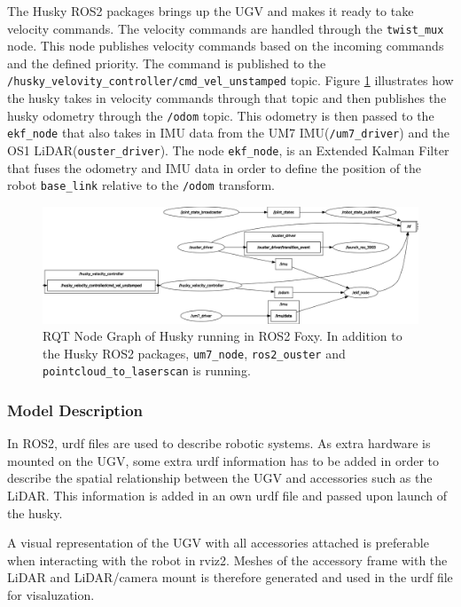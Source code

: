 The Husky ROS2 packages brings up the UGV and makes it ready to take velocity commands. The velocity commands are handled through the \lstinline{twist_mux} node. This node publishes velocity commands based on the incoming commands and the defined priority. The command is published to the \lstinline{/husky_velovity_controller/cmd_vel_unstamped} topic. Figure \ref{fig:rqt_husky} illustrates how the husky takes in velocity commands through that topic and then publishes the husky odometry through the \lstinline{/odom} topic. This odometry is then passed to the \lstinline{ekf_node} that also takes in IMU data from the UM7 IMU(\lstinline{/um7_driver}) and the OS1 LiDAR(\lstinline{ouster_driver}). The node \lstinline{ekf_node}, is an Extended Kalman Filter that fuses the odometry and IMU data in order to define the position of the robot \lstinline{base_link} relative to the \lstinline{/odom} transform.

\begin{figure}[H]
  \centering
  \includegraphics[width = 1\textwidth]{Figures/rqt_husky2.png}
  \caption{RQT Node Graph of Husky running in ROS2 Foxy. In addition to the Husky ROS2 packages, \lstinline{um7_node}, \lstinline{ros2_ouster} and \lstinline{pointcloud_to_laserscan} is running.}
  \label{fig:rqt_husky}
\end{figure}

\subsubsection{Model Description}
In ROS2, urdf files are used to describe robotic systems. As extra hardware is mounted on the UGV, some extra urdf information has to be added in order to describe the spatial relationship between the UGV and accessories such as the LiDAR. This information is added in an own urdf file and passed upon launch of the husky.

A visual representation of the UGV with all accessories attached is preferable when interacting with the robot in rviz2. Meshes of the accessory frame with the LiDAR and LiDAR/camera mount is therefore generated and used in the urdf file for visaluzation. 



